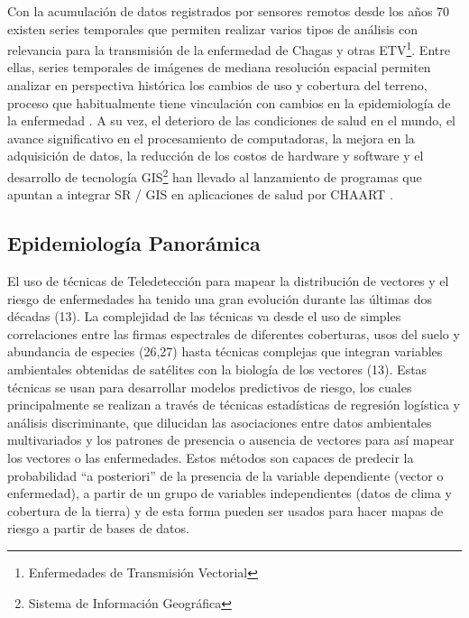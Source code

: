\par Con la acumulación de datos registrados por sensores remotos desde los años
  70 existen series temporales que permiten realizar varios tipos de análisis con
  relevancia para la transmisión de la enfermedad de Chagas y otras
  ETV\footnote{Enfermedades de Transmisión Vectorial}.
  Entre ellas, series temporales de imágenes de mediana resolución espacial
  permiten analizar en perspectiva histórica los cambios de uso y cobertura del
  terreno, proceso que habitualmente tiene vinculación con cambios en la
  epidemiología de la enfermedad \cite{german_temporal}.
  A su vez, el deterioro de las condiciones de salud en el mundo, el avance significativo
  en el procesamiento de computadoras, la mejora en la adquisición de datos,
  la reducción de los costos de hardware y software y el desarrollo de tecnología
  GIS\footnote{Sistema de Información Geográfica} han llevado al lanzamiento
  de programas que apuntan a integrar SR / GIS en aplicaciones de salud por CHAART
  \cite{tesis_riesgo_viral, tesis_gonza, espinosa_temporal, rs_public_health}.


\subsection{Epidemiología Panorámica}


\par El uso de técnicas de Teledetección para mapear la distribución de vectores y el riesgo
  de enfermedades ha tenido una gran evolución durante las últimas dos
  décadas (13). La complejidad de las técnicas va desde el uso de simples
  correlaciones entre las firmas espectrales de diferentes coberturas, usos del
  suelo y abundancia de especies (26,27) hasta técnicas complejas que integran variables
  ambientales obtenidas de satélites con la biología de los vectores (13).
  Estas técnicas se usan para desarrollar modelos predictivos de riesgo,
  los cuales principalmente se realizan a través de técnicas estadísticas de
  regresión logística y análisis discriminante, que dilucidan las asociaciones
  entre datos ambientales multivariados y los patrones de presencia o ausencia de
  vectores para así mapear los vectores o las enfermedades.
  Estos métodos son capaces de predecir la probabilidad “a posteriori” de la
  presencia de la variable dependiente (vector o enfermedad), a partir de un
  grupo de variables independientes (datos de clima y cobertura de la tierra) y de esta
  forma pueden ser usados para hacer mapas de riesgo a partir de bases de datos.


